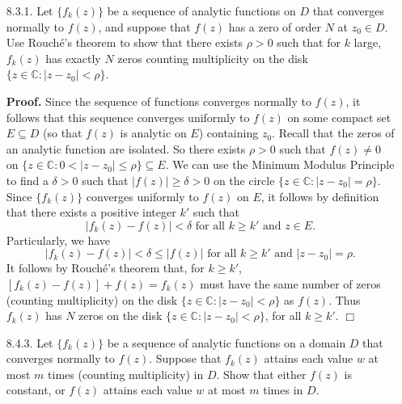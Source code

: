 \documentclass[9pt]{article}
\newcommand{\qed}{\hfill \ensuremath{\Box}}
\newcommand{\C}{\mathbb{C}}
\begin{document}
\begin{enumerate}
   \item[8.3.1.]  Let $\{f_k(z)\}$ be a sequence of analytic functions on $D$
                  that converges normally to $f(z)$, and suppose that $f(z)$ has
                  a zero of order $N$ at $z_0 \in D$. Use Rouch\'{e}'s theorem
                  to show that there exists $\rho > 0$ such that for $k$ large,
                  $f_k(z)$ has exactly $N$ zeros counting multiplicity on the
                  disk $\{z \in \C : |z - z_0| < \rho\}$.

      \textbf{Proof.} Since the sequence of functions converges normally to
      $f(z)$, it follows that this sequence converges uniformly to $f(z)$ on
      some compact set $E \subseteq D$ (so that $f(z)$ is analytic on $E$)
      containing $z_0$. Recall that the zeros of an analytic function are
      isolated. So there exists $\rho > 0$ such that $f(z) \neq 0$ on
      $\{z \in \C : 0 < |z - z_0| \le \rho\} \subseteq E$. We can use the
      Minimum Modulus Principle to find a $\delta > 0$ such that
      $|f(z)| \ge \delta > 0$ on the circle $\{z \in \C : |z - z_0| = \rho\}$.
      Since $\{f_k(z)\}$ converges  uniformly to $f(z)$ on $E$, it follows by
      definition that there exists a positive integer $k'$ such that
      $$|f_k(z) - f(z)| < \delta \text{ for all } k \ge k' \text{ and }
         z \in E.$$
      Particularly, we have
      $$|f_k(z) - f(z)| < \delta \le |f(z)|\text{ for all } k \ge k'\text{ and }
         |z - z_0| = \rho.$$
      It follows by Rouch\'{e}'s theorem that, for $k \ge k'$,
      $[f_k(z) - f(z)] + f(z) = f_k(z)$  must have the same number of zeros
      (counting multiplicity) on the disk $\{z \in \C : |z - z_0| < \rho\}$ as
      $f(z)$. Thus $f_k(z)$ has $N$ zeros on the disk
      $\{z \in \C : |z - z_0| < \rho\}$, for all $k \ge k'$. \qed
   \item[8.4.3.]  Let $\{f_k(z)\}$ be a sequence of analytic functions on a
                  domain $D$ that converges normally to $f(z)$. Suppose that
                  $f_k(z)$ attains each value $w$ at most $m$ times (counting
                  multiplicity) in $D$. Show that either $f(z)$ is constant, or
                  $f(z)$ attains each value $w$ at most $m$ times in $D$.


\end{enumerate}
\end{document}
